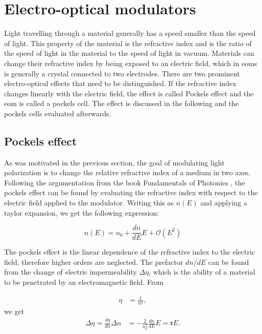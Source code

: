 \section{Electro-optical modulators}
\label{sec:eom}

Light travelling through a material generally has a speed smaller than the speed of light. This property of the material is the refractive index and is the ratio of the speed of light in the material to the speed of light in vacuum. Materials can change their refractive index by being exposed to an electric field, which in \acp{eom} is generally a crystal connected to two electrodes. There are two prominent electro-optical effects that need to be distinguished. If the refractive index changes linearly with the electric field, the effect is called Pockels effect and the \ac{eom} is called a pockels cell. The effect is discussed in the following and the pockels cells evaluated afterwards.

\subsection{Pockels effect}
\label{sec:pockels_effect}

As was motivated in the previous section, the goal of modulating light polarization is to change the relative refractive index of a medium in two axes. Following the argumentation from the book Fundamentals of Photonics \cite{Saleh1991}, the pockels effect can be found by evaluating the refractive index with respect to the electric field applied to the modulator. Writing this as $n(E)$ and applying a taylor expansion, we get the following expression:

\begin{equation}
	n(E) = n_0 + \frac{dn}{dE} E + \mathcal{O}(E^2)
\end{equation}

The pockels effect is the linear dependence of the refractive index to the electric field, therefore higher orders are neglected. The prefactor $dn / dE$ can be found from the change of electric impermeability $\Delta \eta$, which is the ability of a material to be penetrated by an electromagnetic field. From

\begin{align}
	\eta & = \frac{1}{n^2},
\end{align}
we get
\begin{align}
	\label{eq:pockel,refr}
	\Delta \eta = \frac{d \eta}{dn} \Delta n & = -\frac{2}{n_0^3} \frac{dn}{dE} E = \mathfrak{r} E .
\end{align}

